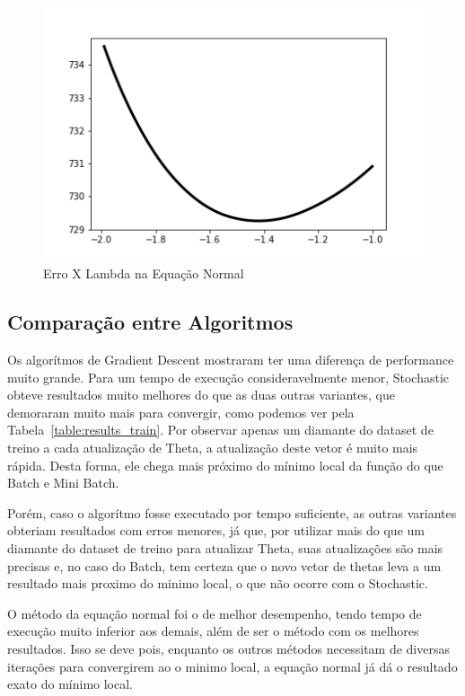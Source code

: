 \documentclass[conference]{IEEEtran}
\begin{document}
\begin{figure}[H]
  \includegraphics[width=\linewidth]{gfx/normaleq_lambdaxcost_1.png}
  \caption{Erro X Lambda na Equação Normal}
  \label{fig:reg}
\end{figure}

\subsection{Comparação entre Algoritmos}

Os algorítmos de Gradient Descent mostraram ter uma diferença de performance muito grande. Para um tempo de execução consideravelmente menor, Stochastic obteve resultados muito melhores do que as duas outras variantes, que demoraram muito mais para convergir, como podemos ver pela Tabela~\ref{table:results_train}. Por observar apenas um diamante do dataset de treino a cada atualização de Theta, a atualização deste vetor é muito mais rápida. Desta forma, ele chega mais próximo do mínimo local da função do que Batch e Mini Batch.

Porém, caso o algorítmo fosse executado por tempo suficiente, as outras variantes obteriam resultados com erros menores, já que, por utilizar mais do que um diamante do dataset de treino para atualizar Theta, suas atualizações são mais precisas e, no caso do Batch, tem certeza que o novo vetor de thetas leva a um resultado mais proximo do minimo local, o que não ocorre com o Stochastic.

O método da equação normal foi o de melhor desempenho, tendo tempo de execução muito inferior aos demais, além de ser o método com os melhores resultados. Isso se deve pois, enquanto os outros métodos necessitam de diversas iterações para convergirem ao o minimo local, a equação normal já dá o resultado exato do mínimo local.
\end{document}
